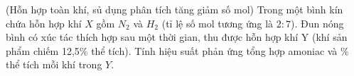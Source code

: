 \begin{vd}
	(Hỗn hợp toàn khí, sủ dụng phân tích tăng giảm số mol)
	Trong một bình kín chứa hỗn hợp khí $X$ gồm $N_2$ và $H_2$ (tỉ lệ số mol tương ứng là $2: 7$). Đun nóng bình có xúc tác thích hợp sau một thời gian, thu được hỗn hợp khí Y (khí sản phẩm chiếm 12,5\% thể tích). Tính hiệu suất phản ứng tổng hợp amoniac và $\%$ thể tích mỗi khí trong $Y$.
	\loigiai{
	}
\end{vd}

